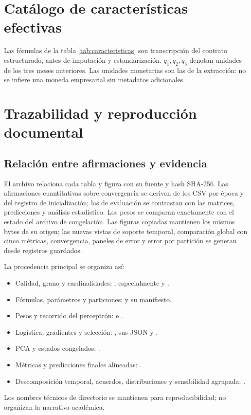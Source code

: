 \section{Catálogo de características efectivas}\label{sec:catalogo}
Las fórmulas de la tabla \ref{tab:caracteristicas} son transcripción del contrato estructurado, antes de imputación y estandarización. $q_1,q_2,q_3$ denotan unidades de los tres meses anteriores. Las unidades monetarias son las de la extracción: no se infiere una moneda empresarial sin metadatos adicionales.
\begingroup\small

\endgroup

\section{Trazabilidad y reproducción documental}
\subsection{Relación entre afirmaciones y evidencia}
El archivo  relaciona cada tabla y figura con su fuente y hash SHA-256. Las afirmaciones cuantitativas sobre convergencia se derivan de los CSV por época y del registro de inicialización; las de evaluación se contrastan con las matrices, predicciones y análisis estadístico. Los pesos se comparan exactamente con el estado del archivo de congelación. Las figuras copiadas mantienen los mismos bytes de su origen; las nuevas vistas de soporte temporal, comparación global con cinco métricas, convergencia, paneles de error y error por partición se generan desde registros guardados.

La procedencia principal se organiza así:
\begin{itemize}
\item Calidad, grano y cardinalidades: , especialmente  y .
\item Fórmulas, parámetros y particiones:  y su manifiesto.
\item Pesos y recorrido del perceptrón:  e .
\item Logística, gradientes y selección: , sus JSON y .
\item PCA y estados congelados: .
\item Métricas y predicciones finales alineadas: .
\item Descomposición temporal, acuerdos, distribuciones y sensibilidad agrupada: .
\end{itemize}
Los nombres técnicos de directorio se mantienen para reproducibilidad; no organizan la narrativa académica.

